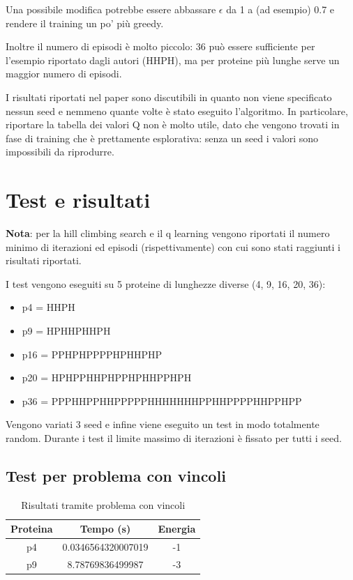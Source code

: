 \documentclass[conference]{IEEEtran}
\begin{document}
Una possibile modifica potrebbe essere abbassare $\epsilon$ da 1 a (ad esempio) 0.7 e rendere il training un po' più greedy.

Inoltre il numero di episodi è molto piccolo: 36 può essere sufficiente per l'esempio riportato dagli autori (HHPH), ma per proteine più lunghe serve un maggior numero di episodi.

I risultati riportati nel paper sono discutibili in quanto non viene specificato nessun seed e nemmeno quante volte è stato eseguito l'algoritmo. In particolare, riportare la tabella dei valori Q non è molto utile, dato che vengono trovati in fase di training che è prettamente esplorativa: senza un seed i valori sono impossibili da riprodurre.

\section{Test e risultati}

\textbf{Nota}: per la hill climbing search  e il q learning vengono riportati il numero minimo di iterazioni ed episodi (rispettivamente) con cui sono stati raggiunti i risultati riportati.

I test vengono eseguiti su 5 proteine di lunghezze diverse (4, 9, 16, 20, 36):

\begin{itemize}
 \item p4 = HHPH
 \item p9 = HPHHPHHPH
 \item p16 = PPHPHPPPPHPHHPHP
 \item p20 = HPHPPHHPHPPHPHHPPHPH
 \item p36 = PPPHHPPHHPPPPPHHHHHHHPPHHPPPPHHPPHPP
\end{itemize}

Vengono variati 3 seed e infine viene eseguito un test in modo totalmente random. Durante i test il limite massimo di iterazioni è fissato per tutti i seed.

\subsection{Test per problema con vincoli}

\begin{table}[H]
\begin{center}
\begin{tabular}{|c|c|c|}
\hline
\textbf{Proteina} & \textbf{Tempo (s)} & \textbf{Energia} \\ \hline
p4 & 0.0346564320007019 & -1 \\ \hline
p9 & 8.78769836499987 & -3 \\ \hline
\end{tabular}
\end{center}
\caption{Risultati tramite problema con vincoli}
\end{table}
\end{document}
